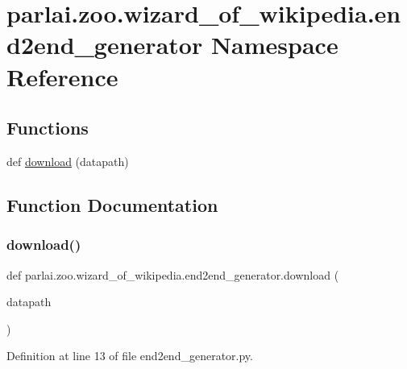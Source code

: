 \hypertarget{namespaceparlai_1_1zoo_1_1wizard__of__wikipedia_1_1end2end__generator}{}\section{parlai.\+zoo.\+wizard\+\_\+of\+\_\+wikipedia.\+end2end\+\_\+generator Namespace Reference}
\label{namespaceparlai_1_1zoo_1_1wizard__of__wikipedia_1_1end2end__generator}
\subsection*{Functions}
\begin{DoxyCompactItemize}
\item 
def \hyperlink{namespaceparlai_1_1zoo_1_1wizard__of__wikipedia_1_1end2end__generator_a3a34c992127ebe52eb1d98dcebbb4d47}{download} (datapath)
\end{DoxyCompactItemize}


\subsection{Function Documentation}
\mbox{\label{namespaceparlai_1_1zoo_1_1wizard__of__wikipedia_1_1end2end__generator_a3a34c992127ebe52eb1d98dcebbb4d47}} 
\subsubsection{\texorpdfstring{download()}{download()}}
{\footnotesize\ttfamily def parlai.\+zoo.\+wizard\+\_\+of\+\_\+wikipedia.\+end2end\+\_\+generator.\+download (\begin{DoxyParamCaption}\item[{}]{datapath }\end{DoxyParamCaption})}



Definition at line 13 of file end2end\+\_\+generator.\+py.



